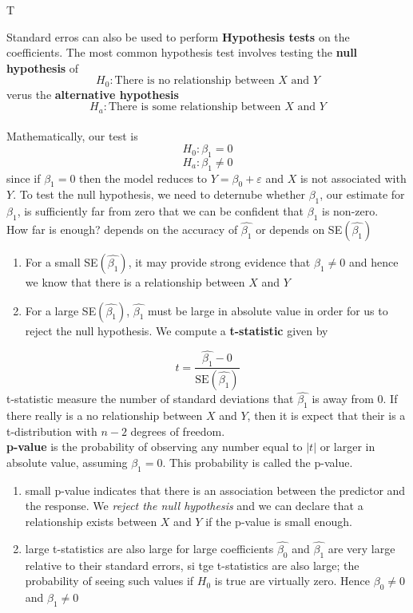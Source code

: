 T\documentclass{article}
\begin{document}
\vspace{5mm}
Standard erros can also be used to perform \textbf{Hypothesis tests} on the coefficients. The most common hypothesis test involves testing the \textbf{null hypothesis} of
\begin{equation*} H_0: \text{There is no relationship between $X$ and $Y$} \end{equation*}
verus the \textbf{alternative hypothesis}
\begin{equation*} H_a: \text{There is some relationship between $X$ and $Y$} \end{equation*}
\\[2mm]
Mathematically, our test is 
\begin{equation*} H_0: \beta_1 = 0 \end{equation*}
\begin{equation*} H_a: \beta_1 \neq 0 \end{equation*}
since if $\beta_1 = 0$ then the model reduces to $Y = \beta_0 + \varepsilon$ and $X$ is not associated with $Y$. To test the null hypothesis, we need to deternube whether $\beta_1$, our estimate for $\beta_1$, is sufficiently far from zero that we can be confident that $\beta_1$ is non-zero. 
\\ How far is enough? depends on the accuracy of $\hat{\beta_1}$  or depends on SE$(\hat{\beta_1})$ 
\begin{enumerate}
    \item For a small SE$(\hat{\beta_1})$, it may provide strong evidence that $\beta_1 \neq 0$ and hence we know that there is a relationship between $X$ and $Y$ 
    \item For a large SE$(\hat{\beta_1})$, $\hat{\beta_1}$ must be large in absolute value in order for us to reject the null hypothesis. We compute a \textbf{t-statistic} given by 
\end{enumerate}
\begin{equation*} t = \frac{\hat{\beta_1} - 0}{\text{SE}(\hat{\beta_1})}  \end{equation*}
t-statistic measure the number of standard deviations that $\hat{\beta_1}$ is away from 0. If there really is a no relationship between $X$ and $Y$, then it is expect that their is a t-distribution with $n-2$ degrees of freedom. 
\\[4mm] \textbf{p-value} is the probability of observing any number equal to $|t|$ or larger in absolute value, assuming $\beta_1 = 0$. This probability is called the p-value. 
\begin{enumerate}
    \item small p-value indicates that there is an association between the predictor and the response. We \textit{reject the null hypothesis} and we can declare that a relationship exists between $X$ and $Y$ if the p-value is small enough.
    \item large t-statistics are also large for large coefficients $\hat{\beta_0}$ and $\hat{\beta_1}$ are very large relative to their standard errors, si tge t-statistics are also large; the probability of seeing such values if $H_0$ is true are virtually zero. Hence $\beta_0 \neq 0$ and $\beta_1 \neq 0$ 
\end{enumerate}
\newpage
\end{document}
